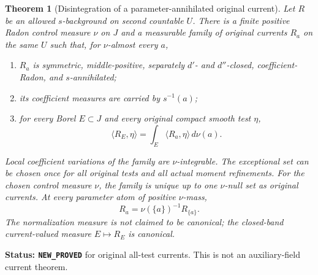 \documentclass[11pt,a4paper]{article}
\numberwithin{equation}{section}
\newtheorem{theorem}{Theorem}[section]
\theoremstyle{definition}
\theoremstyle{remark}
\begin{document}
\begin{theorem}[Disintegration of a parameter-annihilated original current]
\label{thm:r12-original-current-disintegration}
Let $R$ be an allowed $s$-background on second countable $U$.
There is a finite positive Radon control measure $\nu$ on $J$ and
a measurable family of original currents $R_a$ on the same $U$
such that, for $\nu$-almost every $a$,
\begin{enumerate}
\item $R_a$ is symmetric, middle-positive, separately $d'$- and
$d''$-closed, coefficient-Radon, and $s$-annihilated;
\item its coefficient measures are carried by $s^{-1}(a)$;
\item for every Borel $E\subset J$ and every original compact
smooth test $\eta$,
\[
               \langle R_E,\eta\rangle
                    =\int_E\langle R_a,\eta\rangle\,d\nu(a).
 \tag{DI3}
\]
\end{enumerate}
Local coefficient variations of the family are $\nu$-integrable.
The exceptional set can be chosen once for all original tests and
all actual moment refinements. For the chosen control measure $\nu$,
the family is unique up to one $\nu$-null set as original currents.
At every parameter atom of positive $\nu$-mass,
\[
                       R_a=\nu(\{a\})^{-1}R_{\{a\}}.
 \tag{DI4}
\]
The normalization measure is not claimed to be canonical; the
closed-band current-valued measure $E\mapsto R_E$ is canonical.
\end{theorem}

\noindent\textbf{Status: \texttt{NEW\_PROVED}} for original
all-test currents. This is not an auxiliary-field current theorem.
\end{document}
